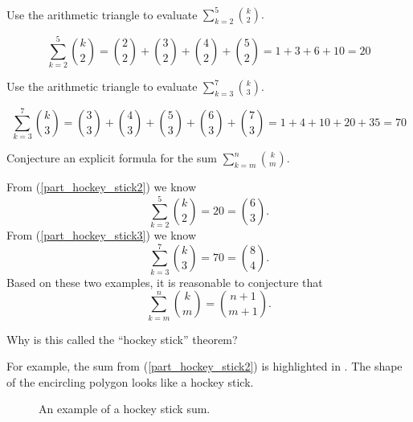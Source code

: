 \begin{exam}
\label{exam_hockey_stick}
~
    \begin{exerpart}
        \item \label{part_hockey_stick2} Use the arithmetic triangle to evaluate $\displaystyle \sum_{k=2}^5 \binom{k}{2}.$
            \begin{soln}
                $$\sum_{k=2}^5 \binom{k}{2} 
                = \binom{2}{2} + \binom{3}{2} + \binom{4}{2} + \binom{5}{2}
                = 1 + 3 + 6 + 10 = 20$$
            \end{soln}
        \item \label{part_hockey_stick3} Use the arithmetic triangle to evaluate $\displaystyle \sum_{k=3}^7 \binom{k}{3}.$
            \begin{soln}
                $$\sum_{k=3}^7 \binom{k}{3}
                = \binom{3}{3} + \binom{4}{3} + \binom{5}{3} + \binom{6}{3} + \binom{7}{3}
                = 1 + 4 + 10 + 20 + 35 = 70$$
            \end{soln}
        \item Conjecture an explicit formula for the sum $\displaystyle \sum_{k=m}^n \binom{k}{m}.$ 
            \begin{soln}
                From (\ref{part_hockey_stick2}) we know $$\sum_{k=2}^5 \binom{k}{2} = 20 = \binom{6}{3}.$$
                From (\ref{part_hockey_stick3}) we know $$\sum_{k=3}^7 \binom{k}{3} = 70 = \binom{8}{4}.$$
                Based on these two examples, it is reasonable to conjecture that $$\sum_{k=m}^n \binom{k}{m} = \binom{n+1}{m+1}.$$
            \end{soln}
        \item Why is this called the ``hockey stick'' theorem?
            \begin{soln}
                For example, the sum from (\ref{part_hockey_stick2}) is highlighted in . The shape of the encircling polygon looks like a hockey stick.

                \begin{figure}[hbtp]
                    \centering   \scalebox{0.85}{}
                    \caption{An example of a hockey stick sum.}
                    \label{fig_hockey_stick}
                \end{figure}
            \end{soln}
        \end{exerpart}
\end{exam}

